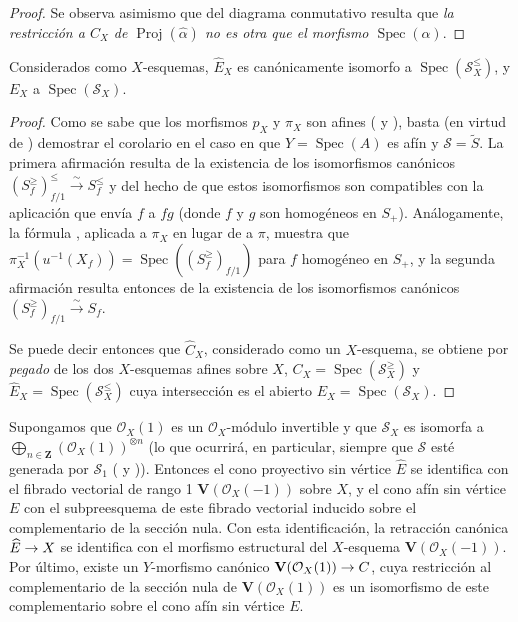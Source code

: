 \documentclass[oneside,10pt]{amsart}
\makeatletter
\renewcommand{\leq}{\leqslant}
\renewcommand{\geq}{\geqslant}
\newcommand{\ega@arrow}[2]{\mathchoice{#1}{#2}{#2}{#2}}
\renewcommand{\to}{\ega@arrow{\longrightarrow}{\rightarrow}}
\newcommand{\oldpage}[2][]{\marginnote{\normalfont\footnotesize\textbf{#1}~|~#2}\ignorespaces}
\let\EGAOriginalLabel\label
\renewcommand{\label}[1]{\phantomsection\EGAOriginalLabel{#1}}
\newcommand*{\ega@labelnumber}[1]{\StrBehind{#1}{.}}
\newcommand{\eref}[1]{\hyperref[#1]{\normalfont{(\ega@labelnumber{#1})}}}
\makeatother
\begin{document}
\begin{proof}
\oldpage[II]{173}
Se observa asimismo que del diagrama conmutativo \eref{II.8.5.3.2-fr} resulta que \emph{la restricción a $C_X$ de $\operatorname{Proj}(\widehat{\alpha})$ no es otra que el morfismo $\operatorname{Spec}(\alpha)$}.
\end{proof}
\begin{corollary}[8.6.3]
\label{II.8.6.3-fr}
Considerados como $X$-esquemas, $\widehat{E}_X$ es canónicamente isomorfo a $\operatorname{Spec}(\mathcal{S}_X^{\leq})$, y $E_X$ a $\operatorname{Spec}(\mathcal{S}_X)$.
\end{corollary}

\begin{proof}
Como se sabe que los morfismos $p_X$ y $\pi_X$ son afines ( y ), basta (en virtud de ) demostrar el corolario en el caso en que $Y=\operatorname{Spec}(A)$ es afín y $\mathcal{S}=\widetilde{S}$.
La primera afirmación resulta de la existencia de los isomorfismos canónicos  $(S_f^{\geq})_{f/1}^{\leq}\xrightarrow{\sim}S_f^{\leq}$ y del hecho de que estos isomorfismos son compatibles con la aplicación que envía $f$ a $fg$ (donde $f$ y $g$ son homogéneos en $S_+$).
Análogamente, la fórmula , aplicada a $\pi_X$ en lugar de a $\pi$, muestra que $\pi_X^{-1}(u^{-1}(X_f))=
\operatorname{Spec}((S_f^{\geq})_{f/1})$ para $f$ homogéneo en $S_+$, y la segunda afirmación resulta entonces de la existencia de los isomorfismos canónicos  $(S_f^{\geq})_{f/1}\xrightarrow{\sim}S_f$.

Se puede decir entonces que $\widehat{C}_X$, considerado como un $X$-esquema, se obtiene por \emph{pegado} de los dos $X$-esquemas afines sobre $X$, $C_X=\operatorname{Spec}(\mathcal{S}_X^{\geq})$ y $\widehat{E}_X=\operatorname{Spec}(\mathcal{S}_X^{\leq})$ cuya intersección es el abierto $E_X=\operatorname{Spec}(\mathcal{S}_X)$.
\end{proof}
\begin{corollary}[8.6.4]
\label{II.8.6.4-fr}
Supongamos que $\mathcal{O}_X(1)$ es un $\mathcal{O}_X$-módulo invertible y que $\mathcal{S}_X$ es isomorfa a $\bigoplus_{n\in\mathbf{Z}}(\mathcal{O}_X(1))^{\otimes n}$ (lo que ocurrirá, en particular, siempre que $\mathcal{S}$ esté generada por $\mathcal{S}_1$ \textup{(} y \textup{))}.
Entonces el cono proyectivo sin vértice $\widehat{E}$ se identifica con el fibrado vectorial de rango 1 $\mathbf{V}(\mathcal{O}_X(-1))$ sobre $X$, y el cono afín sin vértice $E$ con el subpreesquema de este fibrado vectorial inducido sobre el complementario de la sección nula.
Con esta identificación, la retracción canónica $\widehat{E}\to X$ se identifica con el morfismo estructural del $X$-esquema $\mathbf{V}(\mathcal{O}_X(-1))$.
Por último, existe un $Y$-morfismo canónico $\mathbf{V}(\mathcal{O}_X(1))\to C$, cuya restricción al complementario de la sección nula de $\mathbf{V}(\mathcal{O}_X(1))$ es un isomorfismo de este complementario sobre el cono afín sin vértice $E$.
\end{corollary}
\end{document}
